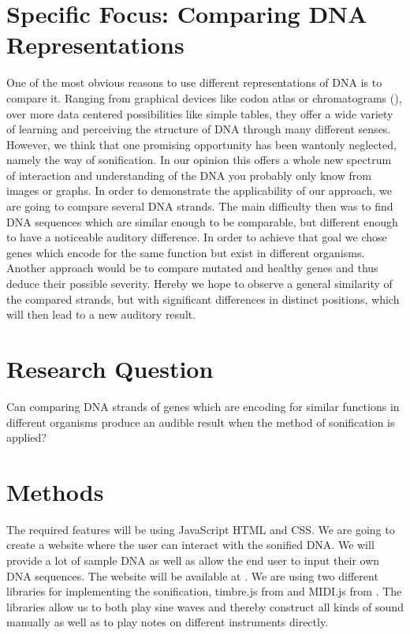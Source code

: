 \documentclass[10pt]{article}
\begin{document}
\section{Specific Focus: Comparing DNA Representations}

One of the most obvious reasons to use different representations of DNA is to compare it. Ranging from graphical devices like codon atlas or chromatograms (\cite{laurence_1989}), over more data centered possibilities like simple tables, they offer a wide variety of learning and perceiving the structure of DNA through many different senses.
However, we think that one promising opportunity has been wantonly neglected, namely the way of sonification. In our opinion this offers a whole new spectrum of interaction and understanding of the DNA you probably only know from images or graphs.
In order to demonstrate the applicability of our approach, we are going to compare several DNA strands. The main difficulty then was to find DNA sequences which are similar enough to be comparable, but different enough to have a noticeable auditory difference.
In order to achieve that goal we chose genes which encode for the same function but exist in different organisms. Another approach would be to compare mutated and healthy genes and thus deduce their possible severity. Hereby we hope to observe a general similarity of the compared strands, but with significant differences in distinct positions, which will then lead to a new auditory result.

\section{Research Question}
Can comparing DNA strands of genes which are encoding for similar functions in different organisms produce an audible result when the method of sonification is applied?

\section{Methods}
The required features will be using JavaScript HTML and CSS. We are going to create a website where the user can interact with the sonified DNA. We will provide a lot of sample DNA as well as allow the end user to input their own DNA sequences. The website will be available at \cite{site:letthednaspeak}. We are using two different libraries for implementing the sonification, timbre.js from \cite{libs:timbrejs} and MIDI.js from \cite{libs:midijs}. The libraries allow us to both play sine waves and thereby construct all kinds of sound manually as well as to play notes on different instruments directly. 
\end{document}
